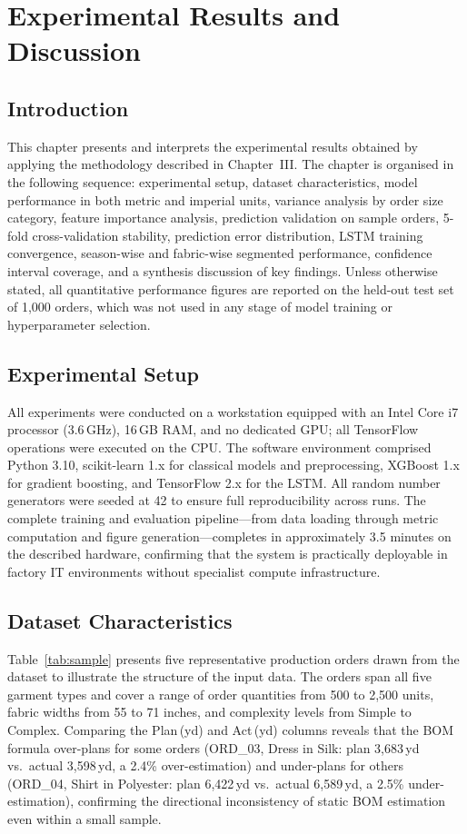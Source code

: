 \chapter{Experimental Results and Discussion}
\label{ch:results}
\sloppy
{}

\section{Introduction}
This chapter presents and interprets the experimental results obtained by applying the methodology described in Chapter~III. The chapter is organised in the following sequence: experimental setup, dataset characteristics, model performance in both metric and imperial units, variance analysis by order size category, feature importance analysis, prediction validation on sample orders, 5-fold cross-validation stability, prediction error distribution, LSTM training convergence, season-wise and fabric-wise segmented performance, confidence interval coverage, and a synthesis discussion of key findings. Unless otherwise stated, all quantitative performance figures are reported on the held-out test set of 1{,}000 orders, which was not used in any stage of model training or hyperparameter selection.

\secdiv
\section{Experimental Setup}
All experiments were conducted on a workstation equipped with an Intel Core i7 processor (3.6\,GHz), 16\,GB RAM, and no dedicated GPU; all TensorFlow operations were executed on the CPU. The software environment comprised Python 3.10, scikit-learn 1.x for classical models and preprocessing, XGBoost 1.x for gradient boosting, and TensorFlow 2.x for the LSTM. All random number generators were seeded at 42 to ensure full reproducibility across runs. The complete training and evaluation pipeline---from data loading through metric computation and figure generation---completes in approximately 3.5 minutes on the described hardware, confirming that the system is practically deployable in factory IT environments without specialist compute infrastructure.

\secdiv
\section{Dataset Characteristics}

Table~\ref{tab:sample} presents five representative production orders drawn from the dataset to illustrate the structure of the input data. The orders span all five garment types and cover a range of order quantities from 500 to 2{,}500 units, fabric widths from 55 to 71 inches, and complexity levels from Simple to Complex. Comparing the Plan\,(yd) and Act\,(yd) columns reveals that the BOM formula over-plans for some orders (ORD\_03, Dress in Silk: plan 3{,}683\,yd vs.\ actual 3{,}598\,yd, a 2.4\% over-estimation) and under-plans for others (ORD\_04, Shirt in Polyester: plan 6{,}422\,yd vs.\ actual 6{,}589\,yd, a 2.5\% under-estimation), confirming the directional inconsistency of static BOM estimation even within a small sample.

